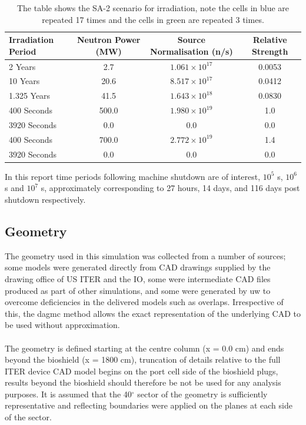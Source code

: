 \documentclass[12pt]{article}
\begin{document}
\begin{table}[ht!]
   \begin{tabular}{| l | c | c | c |}
      \hline 
      Irradiation Period & Neutron Power (MW) & Source Normalisation (n/s) &  Relative Strength \\
      \hline
      2 Years & 2.7 & $1.061\times10^{17}$ & 0.0053 \\
      10 Years & 20.6 & $8.517\times10^{17}$ & 0.0412 \\
      1.325 Years & 41.5 & $1.643\times10^{18}$ & 0.0830 \\
      \cellcolor{blue!25} \cellcolor{blue!25} 400 Seconds & \cellcolor{blue!25} 500.0 & \cellcolor{blue!25} $1.980\times10^{19}$ & \cellcolor{blue!25} 1.0  \\
      \cellcolor{blue!25} 3920 Seconds & \cellcolor{blue!25} 0.0 & \cellcolor{blue!25} 0.0 & \cellcolor{blue!25} 0.0 \\
      \cellcolor{green!25} 400 Seconds & \cellcolor{green!25} 700.0 & \cellcolor{green!25} $2.772\times10^{19}$ &\cellcolor{green!25} 1.4 \\
      \cellcolor{green!25} 3920 Seconds & \cellcolor{green!25} 0.0 & \cellcolor{green!25} 0.0 &\cellcolor{green!25} 0.0 \\
      \hline
\end{tabular}
\caption{The table shows the SA-2 scenario for irradiation, note the
         cells in \textcolor{blue!25}{blue} are repeated 17 times
         and the cells in \textcolor{green!25}{green} are repeated 3
         times.}
\label{tab:irrad_scenario}
\end{table}
In this report time periods following machine shutdown are of interest,
$10^5$ s, $10^6$ s and $10^7$ s, approximately corresponding to 27 
hours, 14 days, and 116 days post shutdown respectively.

\subsection{Geometry}
The geometry used in this simulation was collected from a number of sources;
some models were generated directly from CAD drawings supplied by the
drawing office of US ITER and the IO, some were intermediate CAD files produced
as part of other simulations, and some were generated by \gls{uw} to overcome 
deficiencies in the delivered models such as overlaps. Irrespective of this, the 
\gls{dagmc} method allows the exact representation of the underlying CAD to be used without
approximation.
\\
\\
The geometry is defined starting at the centre column (x = 0.0 cm) and ends
beyond the bioshield (x = 1800 cm), truncation of details relative to the full
ITER device CAD model begins on the port cell side of the bioshield plugs,
results beyond the bioshield should therefore be not be used for any
analysis purposes.  It is assumed that the 40$^{\circ}$ sector of the geometry
is sufficiently representative and reflecting boundaries were applied on the
planes at each side of the sector.
\end{document}
